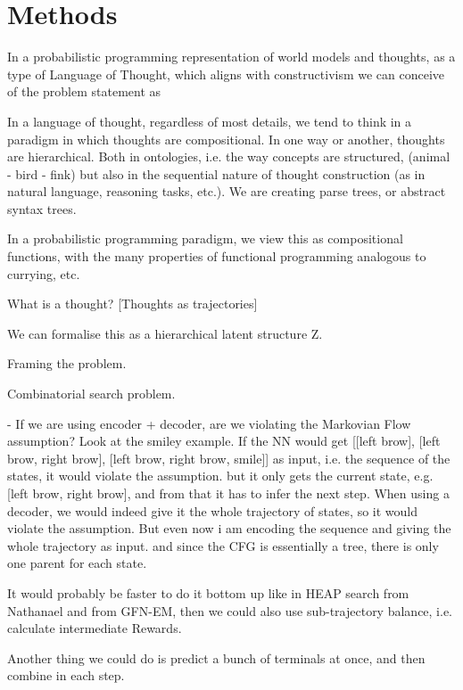\section{Methods}







In a probabilistic programming representation of world models and thoughts, as a type of Language of Thought, which aligns with constructivism we can conceive of the problem statement as 


In a language of thought, regardless of most details, we tend to think in a paradigm in which thoughts are compositional. In one way or another, thoughts are hierarchical.
Both in ontologies, i.e. the way concepts are structured, (animal - bird - fink) but also in the sequential nature of thought construction (as in natural language, reasoning tasks, etc.). We are creating parse trees, or abstract syntax trees. 

In a probabilistic programming paradigm, we view this as compositional functions, with the many properties of functional programming analogous to currying, etc. 

What is a thought?
[Thoughts as trajectories]

We can formalise this as a hierarchical latent structure Z.

Framing the problem.

Combinatorial search problem. 

- If we are using encoder + decoder, are we violating the Markovian Flow assumption?
    Look at the smiley example. If the NN would get [[left brow], [left brow, right brow], [left brow, right brow, smile]] as input, i.e. the sequence of the states, it would violate the assumption. but it only gets the current state, e.g. [left brow, right brow], and from that it has to infer the next step. 
    When using a decoder, we would indeed give it the whole trajectory of states, so it would violate the assumption.
    But even now i am encoding the sequence and giving the whole trajectory as input. and since the CFG is essentially a tree, there is only one parent for each state. 

It would probably be faster to do it bottom up like in HEAP search from Nathanael and from GFN-EM, then we could also use sub-trajectory balance, i.e. calculate intermediate Rewards. 

Another thing we could do is predict a bunch of terminals at once, and then combine in each step. 

